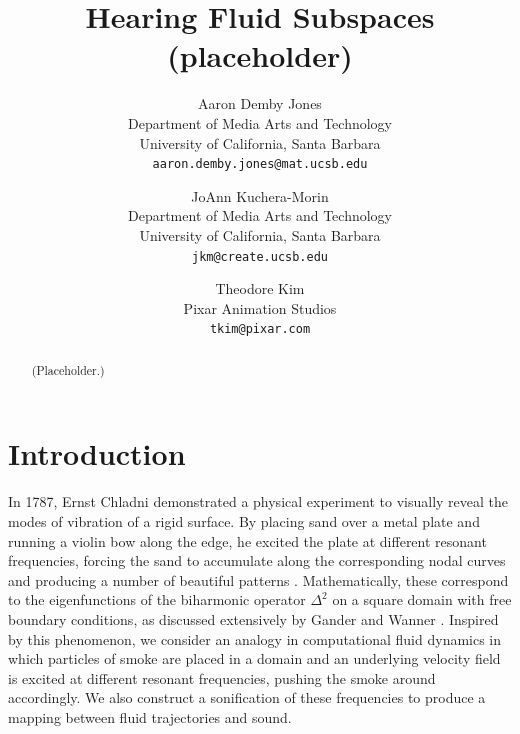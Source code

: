 \documentclass[11pt]{article}
\title{Hearing Fluid Subspaces (placeholder)}
\author{ Aaron Demby Jones\\
Department of Media Arts and Technology\\ University of California, Santa Barbara\\
{\tt aaron.demby.jones@mat.ucsb.edu}
\and
JoAnn Kuchera-Morin\\
Department of Media Arts and Technology\\ University of California, Santa Barbara\\
{\tt jkm@create.ucsb.edu}
\and
Theodore Kim\\
Pixar Animation Studios\\ 
{\tt tkim@pixar.com}
}
\date{}				%
\begin{document}
\newcommand{\UU}{\mathbf{U}}
\newcommand{\uu}{\mathbf{u}}
\newcommand{\vv}{\mathbf{v}}
\newcommand{\utilde}{\mathbf{q}}
\newcommand{\ff}{\mathbf{f}}
\newcommand{\qq}{\mathbf{q}}
\newcommand{\aaa}{\mathbf{a}}
\newcommand{\R}{\mathbb{R}}


\maketitle

\thispagestyle{empty}

\begin{abstract}
(Placeholder.)
\end{abstract}


\section*{Introduction}
In 1787, Ernst Chladni demonstrated a physical experiment to visually reveal the modes of vibration of a rigid surface. By placing sand over a metal plate and running a violin bow along the edge, he excited the plate at different resonant frequencies, forcing the sand to accumulate along the corresponding nodal curves and producing a number of beautiful patterns \cite{Chladni}. Mathematically, these correspond to the eigenfunctions of the biharmonic operator $\Delta^2$ on a square domain with free boundary conditions, as discussed extensively by Gander and Wanner \cite{gander2012euler}. Inspired by this phenomenon, we consider an analogy in computational fluid dynamics in which particles of smoke are placed in a domain and an underlying velocity field is excited at different resonant frequencies, pushing the smoke around accordingly. We also construct a sonification of these frequencies to produce a mapping between fluid trajectories and sound.
\end{document}
